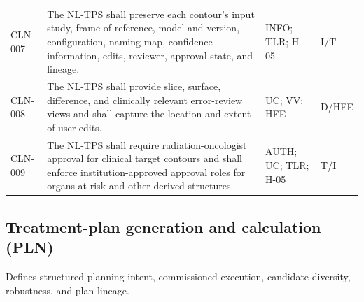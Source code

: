 \documentclass[11pt,letterpaper]{article}
\begin{document}
\begin{small}
\begin{longtable}{@{}L{0.0806\textwidth}L{0.5386\textwidth}L{0.1868\textwidth}L{0.1140\textwidth}@{}}
\addlinespace[2pt]
CLN-007 & The NL-TPS shall preserve each contour's input study, frame of reference, model and version, configuration, naming map, confidence information, edits, reviewer, approval state, and lineage. & INFO; TLR; H-05 & I\slash\allowbreak{}T \\
\addlinespace[2pt]
CLN-008 & The NL-TPS shall provide slice, surface, difference, and clinically relevant error-review views and shall capture the location and extent of user edits. & UC; VV; HFE & D\slash\allowbreak{}HFE \\
\addlinespace[2pt]
CLN-009 & The NL-TPS shall require radiation-oncologist approval for clinical target contours and shall enforce institution-approved approval roles for organs at risk and other derived structures. & AUTH; UC; TLR; H-05 & T\slash\allowbreak{}I \\
\end{longtable}
\end{small}

\subsection{Treatment-plan generation and calculation (PLN)}

Defines structured planning intent, commissioned execution, candidate diversity, robustness, and plan lineage.
\end{document}
